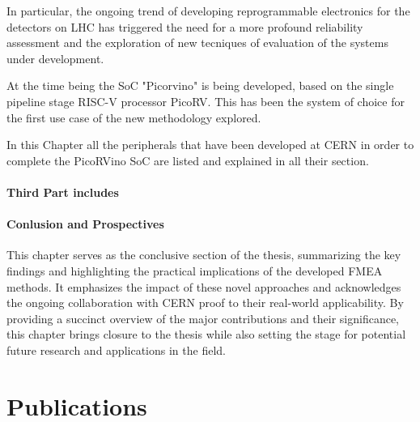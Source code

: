 \documentclass[./dissertation.tex]{subfiles}
\begin{document}
In particular, the ongoing trend of developing reprogrammable electronics for the detectors on LHC has triggered the need for a more profound reliability assessment and the exploration of new tecniques of evaluation of the systems under development.

At the time being the SoC "Picorvino" is being developed, based on the single pipeline stage RISC-V processor PicoRV. This has been the system of choice for the first use case of the new methodology explored.

In this Chapter all the peripherals that have been developed at CERN in order to complete the PicoRVino SoC are listed and explained in all their section.

\noindent \paragraph{Third Part includes}


\paragraph{Conlusion and Prospectives}
This chapter serves as the conclusive section of the thesis, summarizing the key findings and highlighting the practical implications of the developed FMEA methods. It emphasizes the impact of these novel approaches and acknowledges the ongoing collaboration with CERN proof to their real-world applicability. By providing a succinct overview of the major contributions and their significance, this chapter brings closure to the thesis while also setting the stage for potential future research and applications in the field.


\section{Publications}
\end{document}
